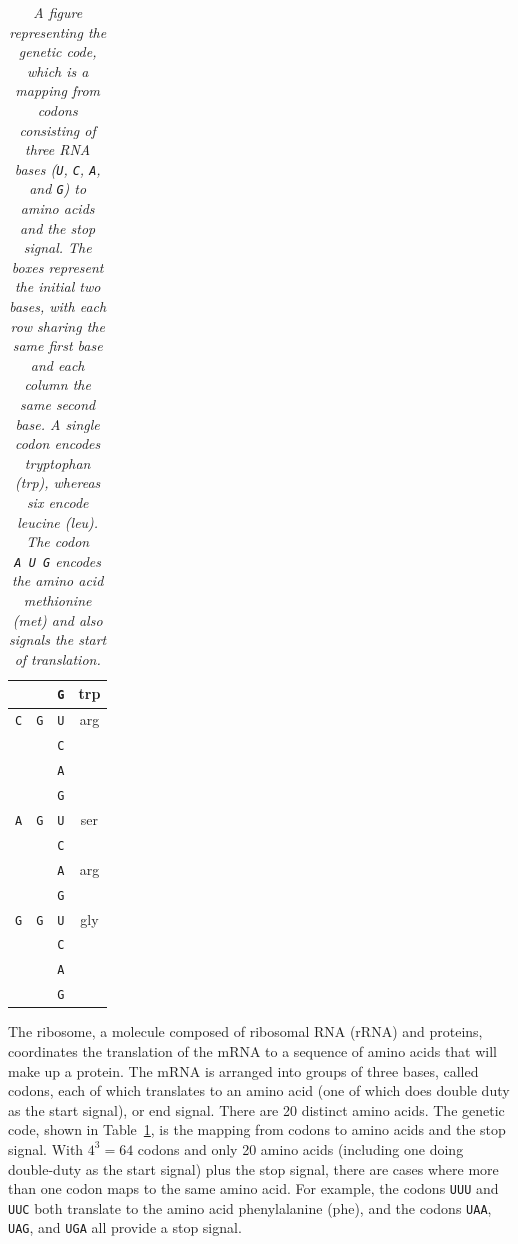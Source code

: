 \documentclass[11pt]{report}
\newcommand{\mybase}[1]{\texttt{#1}\xspace}
\newcommand{\baseA}{\mybase{A}}
\newcommand{\baseC}{\mybase{C}}
\newcommand{\baseG}{\mybase{G}}
\newcommand{\baseU}{\mybase{U}}
\newcommand{\mycaption}[2]{\caption{\small\it #2}\label{#1}}
\begin{document}
\begin{table}[t!]
\begin{tabular}{|ccc|c|}
    \\ \hline
    &  & \baseG & trp
    \\ \hline \hline
    \baseC & \baseG & \baseU & arg
    \\ & & \baseC &
    \\ & & \baseA &
    \\ & & \baseG &
    \\ \hline \hline
    \baseA & \baseG & \baseU & ser
    \\ & & \baseC &
    \\ \hline
    &  & \baseA & arg
    \\ & & \baseG &
    \\ \hline \hline
    \baseG & \baseG & \baseU & gly
    \\ & & \baseC &
    \\ & & \baseA &
    \\ & & \baseG &
    \\ \hline
  \end{tabular}
  \mycaption{tab:genetic-code}{A figure representing the genetic code,
    which is a mapping from codons consisting of three RNA bases
    (\baseU, \baseC, \baseA, and \baseG) to amino acids and the stop
    signal. The boxes represent the initial two bases, with each row
    sharing the same first base and each column the same second base.
    A single codon encodes tryptophan (trp), whereas six encode
    leucine (leu). The codon \baseA~\baseU~\baseG encodes the amino
    acid methionine (met) and also signals the start of translation. }
\end{table}
%
The ribosome, a molecule composed of ribosomal RNA (rRNA) and
proteins, coordinates the translation of the mRNA to a sequence of
amino acids that will make up a protein. The mRNA is arranged into
groups of three bases, called codons, each of which translates to an
amino acid (one of which does double duty as the start signal), or end
signal. There are 20 distinct amino acids. The genetic code, shown in
Table~\ref{tab:genetic-code}, is the mapping from codons to amino
acids and the stop signal. With $4^3 = 64$ codons and only 20 amino
acids (including one doing double-duty as the start signal) plus the
stop signal, there are cases where more than one codon maps to the
same amino acid. For example, the codons \baseU{}\baseU{}\baseU and
\baseU{}\baseU{}\baseC both translate to the amino acid phenylalanine
(phe), and the codons \baseU{}\baseA{}\baseA, \baseU{}\baseA{}\baseG,
and \baseU{}\baseG{}\baseA all provide a stop signal.
\end{document}
